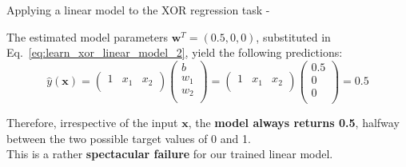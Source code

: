 \begin{frame}[t,allowframebreaks]{Applying a linear model to the XOR regression task -}
    \framebreak


    The estimated model parameters $\mathbf{w}^T=(0.5, 0, 0)$,
    substituted in Eq.~\ref{eq:learn_xor_linear_model_2}, 
    yield the following predictions:\\
    \vspace{0.4cm}
    \begin{equation}
        \hat{y}(\mathbf{x}) = 
        \begin{pmatrix}
            1 & x_1 & x_2 \\
        \end{pmatrix} 
        \begin{pmatrix}
            b   \\
            w_1 \\
            w_2 \\
        \end{pmatrix} =
        \begin{pmatrix}
            1 & x_1 & x_2 \\
        \end{pmatrix} 
        \begin{pmatrix}
            0.5 \\
            0   \\
            0   \\
        \end{pmatrix} = 0.5
        \label{eq:learn_xor_linear_model_predictions}
    \end{equation}

    Therefore, irrespective of the input $\mathbf{x}$, the {\bf model always returns 0.5}, 
    halfway between the two possible target values of 0 and 1.\\
    \vspace{0.2cm}
    This is a rather {\bf spectacular failure} for our trained linear model.

\end{frame}

%
%
%

